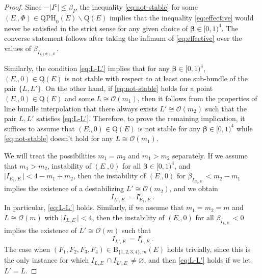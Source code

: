 \documentclass[10pt,a4paper]{amsart}
\newcommand{\calO}{\mathcal{O}}
\newcommand{\qp}{\boldsymbol{\cdot}}
\numberwithin{equation}{section}
\begin{document}
\begin{proof}
Since $-\vert I^{\mathsf{c}}\vert\leq \beta_{I}$, the inequality \eqref{eq:not-stable} for some $(E_{\qp},\Phi)\in\mathrm{QPH}_{0}(E)\backslash\mathrm{Q}(E)$ implies that the inequality \eqref{eq:effective} would never be satisfied in the strict sense for any given choice of $\pmb{\beta}\in[0,1)^{4}$. The converse statement follows after taking the infimum of \eqref{eq:effective} over the values of $\beta_{I_{L(\Phi),E_{\qp}}}$.

Similarly, the condition \eqref{eq:L-L'} implies that for any $\pmb{\beta}\in[0,1)^{4}$, $(E_{\qp},0)\in\mathrm{Q}(E)$ is not stable with respect to at least one sub-bundle of the pair $\{L,L'\}$. On the other hand, if \eqref{eq:not-stable} holds for a point $(E_{\qp},0)\in\mathrm{Q}(E)$ and some $L\cong \calO(m_{1})$, then it follows from the properties of line bundle interpolation that there always exists $L'\cong \calO(m_{2})$ such that the pair $L,L'$ satisfies \eqref{eq:L-L'}. Therefore, to prove the remaining implication, it suffices to assume that $(E_{\qp},0)\in\mathrm{Q}(E)$ is not stable for any $\pmb{\beta}\in[0,1)^{4}$ while \eqref{eq:not-stable} doesn't hold for any $L\cong \calO(m_{1})$.

We will treat the possibilities $m_{1}=m_{2}$ and $m_{1}>m_{2}$ separately. If we assume that $m_{1}>m_{2}$, instability of $(E_{\qp},0)$ for all $\pmb{\beta}\in[0,1)^{4}$, and $\vert I_{E_{1},E_{\qp}}\vert < 4 -m_{1}+m_{2}$, then the instability of $(E_{\qp},0)$ for $\beta_{I_{E_{1},E_{\qp}}} < m_{2}-m_{1}$ implies the existence of a destabilizing $L'\cong\calO(m_{2})$, and we obtain
\[
I_{L',E_{\qp}} = I^{\mathsf{c}}_{E_{1},E_{\qp}}.
\]
In particular, \eqref{eq:L-L'} holds. Similarly, if we assume that $m_{1}=m_{2}=m$ and $L\cong\calO(m)$ with $\vert I_{L,E_{\qp}}\vert <4$, then the instability of $(E_{\qp},0)$ for all $\beta_{I_{L,E_{\qp}}} < 0$ implies the existence of $L'\cong \calO(m)$ such that
\[
I_{L',E_{\qp}} = I^{\mathsf{c}}_{L,E_{\qp}}.
\]
The case when $(F_{1},F_{2},F_{3},F_{4})\in\mathrm{B}_{\{1,2,3,4\},m}(E)$ holds trivially, since this is the only instance for which $I_{L,E_{\qp}}\cap I_{L',E_{\qp}} \neq\varnothing $, and then \eqref{eq:L-L'} holds if we let $L' = L$.
\end{proof}
\end{document}
